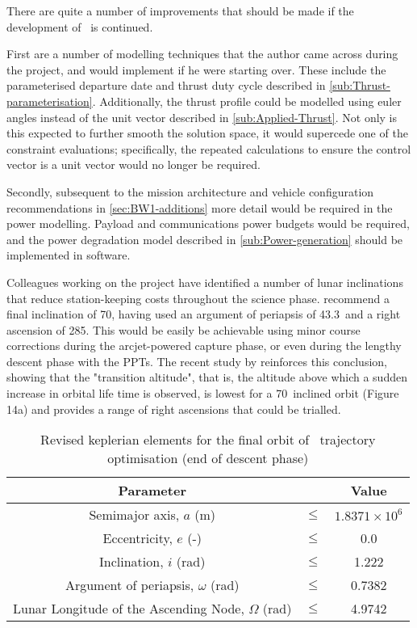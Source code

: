 There are quite a number of improvements that should be made if the development of \BW\ is continued. 

First are a number of modelling techniques that the author came across during the project, and would implement if he were starting over. These include the parameterised departure date and thrust duty cycle described in \autoref{sub:Thrust-parameterisation}. Additionally, the thrust profile could be modelled using euler angles instead of the unit vector described in \autoref{sub:Applied-Thrust}. Not only is this expected to further smooth the solution space, it would supercede one of the constraint evaluations; specifically, the repeated calculations to ensure the control vector is  a unit vector would no longer be required.

Secondly, subsequent to the mission architecture and vehicle configuration recommendations in \autoref{sec:BW1-additions} more detail would be required in the power modelling. Payload and communications power budgets would be required, and the power degradation model described in \autoref{sub:Power-generation} should be implemented in software.

Colleagues working on the project have identified a number of lunar inclinations that reduce station-keeping costs throughout the science phase. \textcite{Zeile2010} recommend a final inclination of 70\degrees, having used an argument of periapsis of 43.3\degrees\ and a right ascension of 285\degrees. This would be easily be achievable using minor course corrections during the arcjet-powered capture phase, or even during the lengthy descent phase with the PPTs. The recent study by \textcite{Gupta2011} reinforces this conclusion, showing that the "transition altitude", that is, the altitude above which a sudden increase in orbital life time is observed, is lowest for a 70\degrees\ inclined orbit (Figure 14a) and provides a range of right ascensions that could be trialled.

\begin{table}[h]
\caption{Revised keplerian elements for the final orbit of \BW\ trajectory optimisation (end of descent phase)}
\label{tab:Phase-5-constraints-revised}
\begin{center}
\begin{tabular} {ccc}\toprule
Parameter && Value\\\midrule
Semimajor axis, $a$ (m) &$\le$& $1.8371\times 10^6$\\
Eccentricity, $e$ (-) &$\le$& 0.0\\
Inclination, $i$ (rad) &$\le$& 1.222\\
Argument of periapsis, $\omega$ (rad) &$\le$& 0.7382 \\
Lunar Longitude of the Ascending Node, $\Omega$ (rad) &$\le$& 4.9742 \\\bottomrule
\end{tabular}
\end{center}
\end{table}

